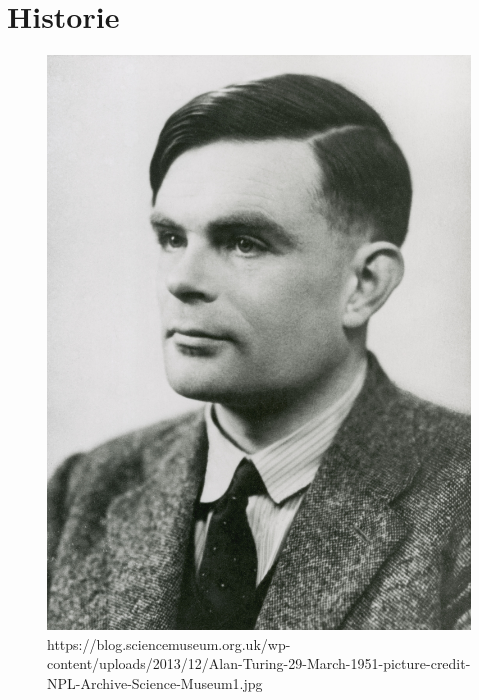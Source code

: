 \section{Historie}

\begin{figure}

\includegraphics[scale=0.3]{Alan_Turing_Portrait.jpg}
\caption{https://blog.sciencemuseum.org.uk/wp-content/uploads/2013/12/Alan-Turing-29-March-1951-picture-credit-NPL-Archive-Science-Museum1.jpg}

\end{figure}

